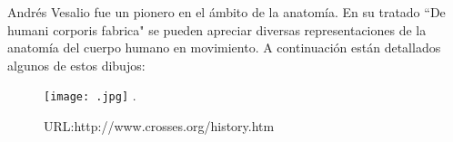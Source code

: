 Andrés Vesalio fue un pionero en el ámbito de la anatomía. En su tratado ``De humani corporis fabrica" se pueden apreciar diversas representaciones de la anatomía del cuerpo humano en movimiento. A continuación están detallados algunos de estos dibujos:
\begin{figure}[ht!]
    \centering
    \texttt{[image: .jpg]}
   .\caption{URL:http://www.crosses.org/history.htm}
\end{figure}

